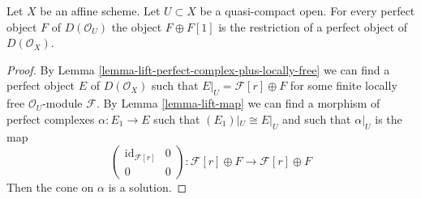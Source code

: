 \begin{lemma}
\label{lemma-lift-perfect-complex-plus-shift}
Let $X$ be an affine scheme. Let $U \subset X$ be a quasi-compact open.
For every perfect object $F$ of $D(\mathcal{O}_U)$
the object $F \oplus F[1]$ is the restriction of
a perfect object of $D(\mathcal{O}_X)$.
\end{lemma}

\begin{proof}
By Lemma \ref{lemma-lift-perfect-complex-plus-locally-free}
we can find a perfect object $E$ of $D(\mathcal{O}_X)$
such that $E|_U = \mathcal{F}[r] \oplus F$ for some finite locally
free $\mathcal{O}_U$-module $\mathcal{F}$.
By Lemma \ref{lemma-lift-map} we can find a morphism of
perfect complexes $\alpha : E_1 \to E$ such that $(E_1)|_U \cong E|_U$
and such that $\alpha|_U$ is the map
$$
\left(
\begin{matrix}
\text{id}_{\mathcal{F}[r]} & 0 \\
0 & 0
\end{matrix}
\right)
:
\mathcal{F}[r] \oplus F \to \mathcal{F}[r] \oplus F
$$
Then the cone on $\alpha$ is a solution.
\end{proof}
